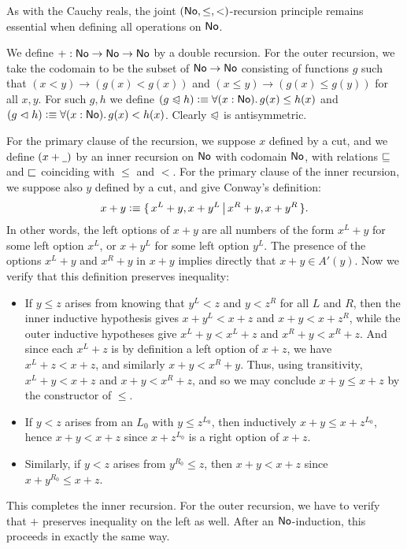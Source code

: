 As with the Cauchy reals, the joint $(\mathsf{No},\le,<)$-recursion principle remains essential when defining all operations on $\mathsf{No}$.

\begin{eg}
We define $\mathord+:\mathsf{No}\to\mathsf{No}\to\mathsf{No}$ by a double recursion.
For the outer recursion, we take the codomain to be the subset of $\mathsf{No}\to\mathsf{No}$ consisting of functions $g$ such that $(x<y) \to (g(x)<g(x))$ and $(x\le y) \to (g(x)\le g(y))$ for all $x,y$.
For such $g,h$ we define $(g\ble h)\defeq \fall{x:\NO} g(x)\le h(x)$ and $(g\blt h)\defeq \fall{x:\NO} g(x)< h(x)$.
Clearly $\trianglelefteqslant$ is antisymmetric.

For the primary clause of the recursion, we suppose $x$ defined by a cut, and we define $(x+\mathord{\underline{\hspace{1ex}}})$ by an inner recursion on $\mathsf{No}$ with codomain $\mathsf{No}$, with relations $\sqsubseteq$ and $\sqsubset$ coinciding with $\le$ and $<$.
For the primary clause of the inner recursion, we suppose also $y$ defined by a cut, and give Conway's definition:
\[ x+y \vcentcolon\equiv \{\,x^L+y, x+y^L\,\big|\,x^R+y,x+y^R\,\}. \]
In other words, the left options of $x+y$ are all numbers of the form $x^L+y$ for some left option $x^L$, or $x+y^L$ for some left option $y^L$.
The presence of the options $x^L+y$ and $x^R+y$ in $x+y$ implies directly that $x+y \in A'(y)$.
Now we verify that this definition preserves inequality:
\begin{itemize}
\item If $y\le z$ arises from knowing that $y^L<z$ and $y<z^R$ for all $L$ and $R$, then the inner inductive hypothesis gives $x+y^L<x+z$ and $x+y < x+z^R$, while the outer inductive hypotheses give $x^L+y < x^L+z$ and $x^R+ y < x^R+z$.
  And since each $x^L+z$ is by definition a left option of $x+z$, we have $x^L+z < x+z$, and similarly $x+y < x^R+y$.
  Thus, using transitivity, $x^L+y < x+z$ and $x+y < x^R+z$, and so we may conclude $x+y \le x+z$ by the constructor of $\le$.
\item If $y<z$ arises from an $L_0$ with $y\le z^{L_0}$, then inductively $x+y \le x+z^{L_0}$, hence $x+y<x+z$ since $x+z^{L_0}$ is a right option of $x+z$.
\item Similarly, if $y<z$ arises from $y^{R_0}\le z$, then $x+y<x+z$ since $x+y^{R_0}\le x+z$.
\end{itemize}
This completes the inner recursion.
For the outer recursion, we have to verify that $+$ preserves inequality on the left as well.
After an $\mathsf{No}$-induction, this proceeds in exactly the same way.
\end{eg}

